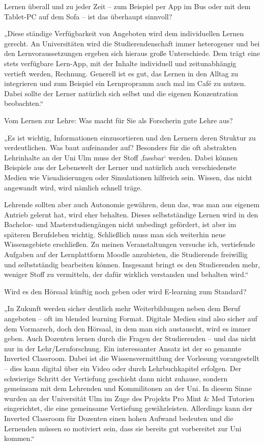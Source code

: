 Lernen überall und zu jeder Zeit – zum Beispiel per App im Bus oder mit dem Tablet-PC auf dem Sofa – ist das überhaupt sinnvoll?

„Diese ständige Verfügbarkeit von Angeboten wird dem individuellen Lernen gerecht. An Universitäten wird die Studierendenschaft immer heterogener und bei den Lernvoraussetzungen ergeben sich hieraus große Unterschiede. Dem trägt eine stets verfügbare Lern-App, mit der Inhalte individuell und zeitunabhängig vertieft werden, Rechnung. Generell ist es gut, das Lernen in den Alltag zu integrieren und zum Beispiel ein Lernpropramm auch mal im Café zu nutzen. Dabei sollte der Lerner natürlich sich selbst und die eigenen Konzentration beobachten.“

Vom Lernen zur Lehre: Was macht für Sie als Forscherin gute Lehre aus?

„Es ist wichtig, Informationen einzusortieren und den Lernern deren Struktur zu verdeutlichen. Was baut aufeinander auf? Besonders für die oft abstrakten Lehrinhalte an der Uni Ulm muss der Stoff ,fassbar‘ werden. Dabei können Beispiele aus der Lebenswelt der Lerner und natürlich auch verschiedenste Medien wie Visualisierungen oder Simulationen hilfreich sein. Wissen, das nicht angewandt wird, wird nämlich schnell träge. 

Lehrende sollten aber auch Autonomie gewähren, denn das, was man aus eigenem Antrieb gelernt hat, wird eher behalten. Dieses selbstständige Lernen wird in den Bachelor- und Masterstudiengängen nicht unbedingt gefördert, ist aber im späteren Berufsleben wichtig. Schließlich muss man sich weiterhin neue Wissensgebiete erschließen. Zu meinen Veranstaltungen versuche ich, vertiefende Aufgaben auf der Lernplattform Moodle anzubieten, die Studierende freiwillig und selbstständig bearbeiten können. Insgesamt bringt es den Studierenden mehr, weniger Stoff zu vermitteln, der dafür wirklich verstanden und behalten wird.“

Wird es den Hörsaal künftig noch geben oder wird E-learning zum Standard?

„In Zukunft werden sicher deutlich mehr Weiterbildungen neben dem Beruf angeboten – oft im blended learning Format. Digitale Medien sind also sicher auf dem Vormarsch, doch den Hörsaal, in dem man sich austauscht, wird es immer geben. Auch Dozenten lernen durch die Fragen der Studierenden – und das nicht nur in der Lehr/Lernforschung. 
Ein interessanter Ansatz ist der so genannte Inverted Classroom. Dabei ist die Wissensvermittlung der Vorlesung vorangestellt – dies kann digital über ein Video oder durch Lehrbuchkapitel erfolgen. Der schwierige Schritt der Vertiefung geschieht dann nicht zuhause, sondern gemeinsam mit dem Lehrenden und Kommilitonen an der Uni. In diesem Sinne wurden an der Universität Ulm im Zuge des Projekts Pro Mint & Med Tutorien eingerichtet, die eine gemeinsame Vertiefung gewährleisten. Allerdings kann der Inverted Classroom für Dozenten einen hohen Aufwand bedeuten und die Lernenden müssen so motiviert sein, dass sie bereits gut vorbereitet zur Uni kommen.“

